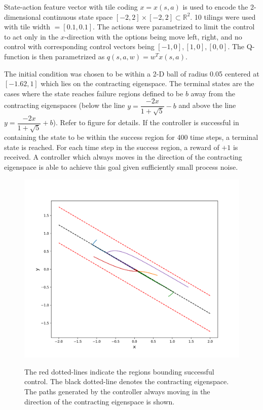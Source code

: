 \documentclass{article}
\begin{document}
 State-action feature vector with tile coding $x = x(s, a)$ is used to encode the 2-dimensional continuous state space $[-2, 2] \times [-2, 2] \subset \mathbb{R}^2$. 10 tilings were used with tile width $= [0.1, 0.1]$. The actions were parametrized to limit the control to act only in the $x$-direction with the options being move left, right, and no control with corresponding control vectors being $[-1, 0], [1, 0], [0,0]$. The Q-function is then parametrized as $q(s, a, w) = w^Tx(s,a)$. 
 
The initial condition was chosen to be within a 2-D ball of radius 0.05 centered at $[-1.62, 1]$ which lies on the contracting eigenspace. The terminal states are the cases where the state reaches failure regions defined to be $b$ away from the contracting eigenspaces (below the line $y = \dfrac{-2x}{1+\sqrt{5}} - b$ and above the line $y = \dfrac{-2x}{1+\sqrt{5}} + b$). Refer to figure \label{fig:o_control} for details. If the controller is successful in containing the state to be within the success region for 400 time steps, a terminal state is reached. For each time step in the success region, a reward of $+1$ is received. A controller which always moves in the direction of the contracting eigenspace is able to achieve this goal given sufficiently small process noise. 


\begin{figure}[H]
\includegraphics[scale=0.5]{optimal_controller.png}
\label{fig:o_control}
\caption{The red dotted-lines indicate the regions bounding successful control. The black dotted-line denotes the contracting eigenspace. The paths generated by the controller always moving in the direction of the contracting eigenspace is shown.}
\end{figure}
\end{document}
